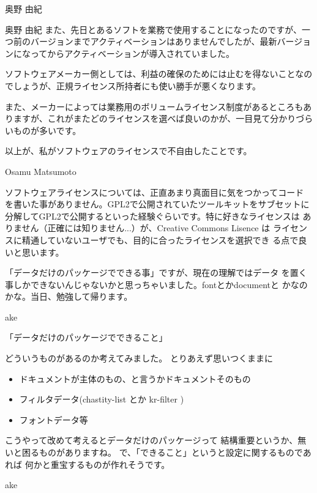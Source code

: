 \documentclass[cjk,dvipdfmx,12pt]{beamer}
\begin{document}
\begin{frame}{奥野 由紀}
\end{frame}\begin{frame}{奥野 由紀}
また、先日とあるソフトを業務で使用することになったのですが、一つ前のバージョンまでアクティベーションはありませんでしたが、最新バージョンになってからアクティベーションが導入されていました。

ソフトウェアメーカー側としては、利益の確保のためには止むを得ないことなのでしょうが、正規ライセンス所持者にも使い勝手が悪くなります。

また、メーカーによっては業務用のボリュームライセンス制度があるところもありますが、これがまたどのライセンスを選べば良いのかが、一目見て分かりづらいものが多いです。

以上が、私がソフトウェアのライセンスで不自由したことです。

\end{frame}\begin{frame}{Osamu Matsumoto}

ソフトウェアライセンスについては、正直あまり真面目に気をつかってコード
を書いた事がありません。GPL2で公開されていたツールキットをサブセットに
分解してGPL2で公開するといった経験ぐらいです。特に好きなライセンスは
ありません（正確には知りません...）が、Creative Commons Lisence は
ライセンスに精通していないユーザでも、目的に合ったライセンスを選択でき
る点で良いと思います。

「データだけのパッケージでできる事」ですが、現在の理解ではデータ
を置く事しかできないんじゃないかと思っちゃいました。fontとかdocumentと
かなのかな。当日、勉強して帰ります。


\end{frame}\begin{frame}{ake}

「データだけのパッケージでできること」

どういうものがあるのか考えてみました。
とりあえず思いつくままに
\begin{itemize}
 \item  ドキュメントが主体のもの、と言うかドキュメントそのもの
 \item  フィルタデータ(chastity-list とか kr-filter )
 \item  フォントデータ等
\end{itemize}
こうやって改めて考えるとデータだけのパッケージって
結構重要というか、無いと困るものがありますね。
で、「できること」というと設定に関するものであれば
何かと重宝するものが作れそうです。
\end{frame}\begin{frame}{ake}


\end{frame}
\end{document}
